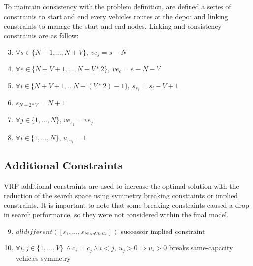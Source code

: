 To maintain consistency with the problem definition, are defined a series of constraints to start and end every vehicles routes at the depot and linking constraints to manage the start and end nodes.\newline
Linking and consistency constraints are as follow:
\begin{enumerate}
 \setcounter{enumi}{2}
    \item \begin{math}\forall s \in \{N+1, ..., N + V\},\: ve_{s} = s - N\end{math}
    \item \begin{math}\forall e \in \{N + V + 1, ..., N + V * 2\}, \:ve_{e} = e - N - V\end{math}
    \item \begin{math}\forall i \in \{N + V + 1,...N + (V * 2) - 1\}, \:s_{s_{i}} = s_{i} - V + 1 \end{math}
    \item \begin{math}s_{N + 2 * V} = N + 1\end{math}
    \item \begin{math}\forall j \in \{1,..., N\}, \:ve_{s_{j}} = ve_{j}\end{math}
    \item \begin{math}\forall i \in \{1,...,N\},\:u_{ve_{i}} = 1 \end{math}
\end{enumerate}
\subsection{Additional Constraints}
VRP additional constraints are used to increase the optimal solution with the reduction of the search space using symmetry breaking constraints or implied constraints. It is important to note that some breaking constraints caused a drop in search performance, so they were not considered within the final model.

\begin{enumerate}
 \setcounter{enumi}{8}
    \item \begin{math}alldifferent([s_{1},...,s_{NumVisits}])\end{math} successor implied constraint
    \item \begin{math}\forall i,j \in \{1,...,V\} \: \land c_{i} = c_{j} \land i < j,\: u_{j} > 0 \Rightarrow u_{i} > 0\end{math} breaks same-capacity vehicles symmetry
\end{enumerate}
\newpage
